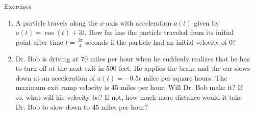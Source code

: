 \documentclass[../revisedmain.tex]{subfiles}
\begin{document}
\begin{center}
	\LARGE Exercises
\end{center}
\begin{enumerate}
	\item A particle travels along the $x$-axis with acceleration $a(t)$ given by $a(t)=\cos(t)+3t$. How far has the particle traveled from its initial point after time $t=\frac{3\pi}{4}$ seconds if the particle had an initial velocity of 0?
	\item Dr. Bob is driving at $70$ miles per hour when he suddenly realizes that he has to turn off at the next exit in $500$ feet. He applies the brake and the car slows down at an acceleration of $a(t)=-0.5t$ miles per square hours. The maximum exit ramp velocity is 45 miles per hour. Will Dr. Bob make it? If so, what will his velocity be? If not, how much more distance would it take Dr. Bob to slow down to 45 miles per hour?
\end{enumerate}
\end{document}
